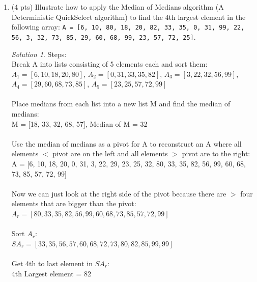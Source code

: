 \documentclass[12pt]{article}
\theoremstyle{remark}
\newtheorem*{solution}{Solution}
\begin{document}
\begin{enumerate}
\item (4 pts) Illustrate how to apply the Median of Medians algorithm (A Deterministic QuickSelect algorithm) to find the $4$th largest element in the following array: \texttt{A = [6, 10, 80, 18, 20, 82, 33, 35, 0, 31, 99, 22, 56, 3, 32, 73, 85, 29, 60, 68, 99, 23, 57, 72, 25]}.
\begin{solution} Steps: \\
Break A into lists consisting of 5 elements each and sort them: \\
$A_1 = [6, 10, 18, 20, 80]$, $A_2 = [0, 31, 33, 35, 82]$, $A_3 = [3, 22, 32, 56, 99]$, $A_4 = [29, 60, 68, 73, 85]$, $A_5 = [23, 25, 57, 72, 99]$ \\ \\
Place medians from each list into a new list M and find the median of medians: \\
M = [18, 33, 32, 68, 57], Median of M = 32 \\ \\
Use the median of medians as a pivot for A to reconstruct an A where all elements $<$ pivot are on the left and all elements $>$ pivot are to the right:\\
A = [6, 10, 18, 20, 0, 31, 3, 22, 29, 23, 25, 32, 80, 33, 35, 82, 56, 99, 60, 68, 73, 85, 57, 72, 99] \\ \\
Now we can just look at the right side of the pivot because there are $>$ four elements that are bigger than the pivot: \\
$A_r = [80, 33, 35, 82, 56, 99, 60, 68, 73, 85, 57, 72, 99]$ \\ \\
Sort $A_r$: \\
$SA_r = [33, 35, 56, 57, 60, 68, 72, 73, 80, 82, 85, 99, 99]$ \\ \\
Get 4th to last element in $SA_r$: \\
4th Largest element  = 82



\end{solution}
\end{enumerate}
\end{document}
